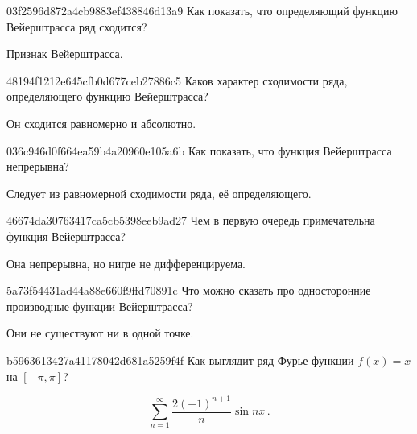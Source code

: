 \begin{note}{03f2596d872a4cb9883ef438846d13a9}
    Как показать, что определяющий функцию Вейерштрасса ряд сходится?

    \begin{cloze}{1}
        Признак Вейерштрасса.
    \end{cloze}
\end{note}

\begin{note}{48194f1212e645cfb0d677ceb27886c5}
    Каков характер сходимости ряда, определяющего функцию Вейерштрасса?

    \begin{cloze}{1}
        Он сходится равномерно и абсолютно.
    \end{cloze}
\end{note}

\begin{note}{036c946d0f664ea59b4a20960e105a6b}
    Как показать, что функция Вейерштрасса непрерывна?

    \begin{cloze}{1}
        Следует из равномерной сходимости ряда, её определяющего.
    \end{cloze}
\end{note}

\begin{note}{46674da30763417ca5cb5398eeb9ad27}
    Чем в первую очередь примечательна функция Вейерштрасса?

    \begin{cloze}{1}
        Она непрерывна, но нигде не дифференцируема.
    \end{cloze}
\end{note}

\begin{note}{5a73f54431ad44a88e660f9ffd70891c}
    Что можно сказать про односторонние производные функции Вейерштрасса?

    \begin{cloze}{1}
        Они не существуют ни в одной точке.
    \end{cloze}
\end{note}

\begin{note}{b5963613427a41178042d681a5259f4f}
    Как выглядит ряд Фурье функции \({ f(x) = x }\) на \({ [-\pi, \pi] }\)?

    \begin{cloze}{1}
        \[
            \sum_{n=1}^{\infty} \frac{2(-1)^{n+1}}{n} \sin nx\,.
        \]
    \end{cloze}
\end{note}

